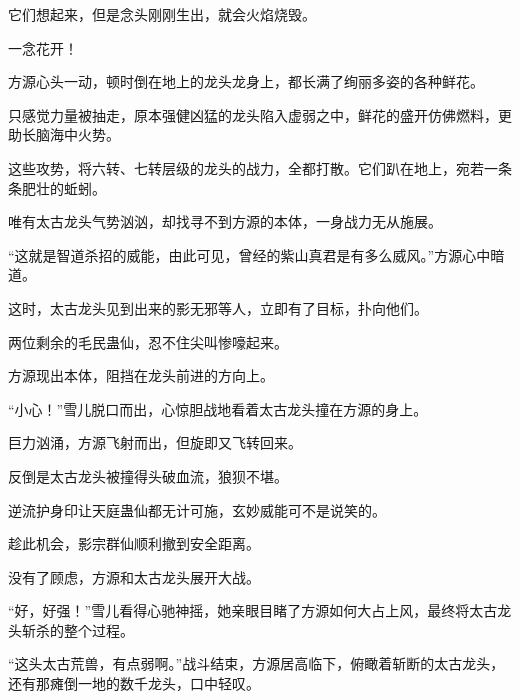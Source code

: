 \begin{this_body}
它们想起来，但是念头刚刚生出，就会火焰烧毁。

一念花开！

方源心头一动，顿时倒在地上的龙头龙身上，都长满了绚丽多姿的各种鲜花。

只感觉力量被抽走，原本强健凶猛的龙头陷入虚弱之中，鲜花的盛开仿佛燃料，更助长脑海中火势。

这些攻势，将六转、七转层级的龙头的战力，全都打散。它们趴在地上，宛若一条条肥壮的蚯蚓。

唯有太古龙头气势汹汹，却找寻不到方源的本体，一身战力无从施展。

“这就是智道杀招的威能，由此可见，曾经的紫山真君是有多么威风。”方源心中暗道。

这时，太古龙头见到出来的影无邪等人，立即有了目标，扑向他们。

两位剩余的毛民蛊仙，忍不住尖叫惨嚎起来。

方源现出本体，阻挡在龙头前进的方向上。

“小心！”雪儿脱口而出，心惊胆战地看着太古龙头撞在方源的身上。

巨力汹涌，方源飞射而出，但旋即又飞转回来。

反倒是太古龙头被撞得头破血流，狼狈不堪。

逆流护身印让天庭蛊仙都无计可施，玄妙威能可不是说笑的。

趁此机会，影宗群仙顺利撤到安全距离。

没有了顾虑，方源和太古龙头展开大战。

“好，好强！”雪儿看得心驰神摇，她亲眼目睹了方源如何大占上风，最终将太古龙头斩杀的整个过程。

“这头太古荒兽，有点弱啊。”战斗结束，方源居高临下，俯瞰着斩断的太古龙头，还有那瘫倒一地的数千龙头，口中轻叹。

\end{this_body}

